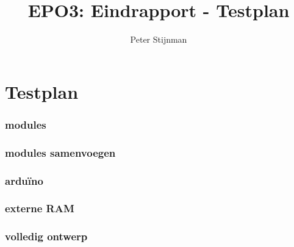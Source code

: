 \documentclass{scrartcl} %
\author{Peter Stijnman}
\title{EPO3: Eindrapport - Testplan}
\begin{document}
\chapter{Testplan}
\label{ch:testplan}

\subsection{modules}




\subsection{modules samenvoegen}




\subsection{arduïno}




\subsection{externe RAM}




\subsection{volledig ontwerp}
\end{document}

